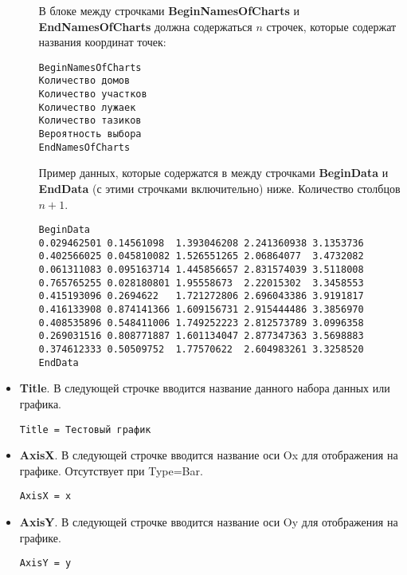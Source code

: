 \documentclass[a4paper,12pt]{article}
\begin{document}
\begin{itemize}
\begin{itemize}
В блоке между строчками \textbf{BeginNamesOfCharts} и \textbf{EndNamesOfCharts} должна содержаться $ n $ строчек, которые содержат названия координат точек:
\begin{lstlisting}[label=NPoints,caption=Для NPoints ]
BeginNamesOfCharts
Количество домов
Количество участков
Количество лужаек
Количество тазиков
Вероятность выбора
EndNamesOfCharts
\end{lstlisting}

Пример данных, которые содержатся в между строчками \textbf{BeginData} и \textbf{EndData} (с этими строчками включительно) ниже.  Количество столбцов $n+1$.
\begin{lstlisting}[label=NPoints_2,caption=Для NPoints ]
BeginData
0.029462501	0.14561098	1.393046208	2.241360938	3.1353736
0.402566025	0.045810082	1.526551265	2.06864077	3.4732082
0.061311083	0.095163714	1.445856657	2.831574039	3.5118008
0.765765255	0.028180801	1.95558673	2.22015302	3.3458553
0.415193096	0.2694622	1.721272806	2.696043386	3.9191817
0.416133908	0.874141366	1.609156731	2.915444486	3.3856970
0.408535896	0.548411006	1.749252223	2.812573789	3.0996358
0.269031516	0.808771887	1.601134047	2.877347363	3.5698883
0.374612333	0.50509752	1.77570622	2.604983261	3.3258520
EndData
\end{lstlisting}

\end{itemize}

\item \textbf{Title}.
В следующей строчке вводится название данного набора данных или графика.

\begin{lstlisting}[label=Line04,caption=Название графика или набора данных]
Title = Тестовый график
\end{lstlisting}

\item \textbf{AxisX}.
В следующей строчке вводится название оси Ox для отображения на графике. Отсутствует при Type=Bar.

\begin{lstlisting}[label=Line04,caption=Название оси Ox]
AxisX = x
\end{lstlisting}

\item \textbf{AxisY}.
В следующей строчке вводится название оси Oy для отображения на графике.

\begin{lstlisting}[label=Line04,caption=Название оси Oy]
AxisY = y
\end{lstlisting}


\end{itemize}
\end{document}
